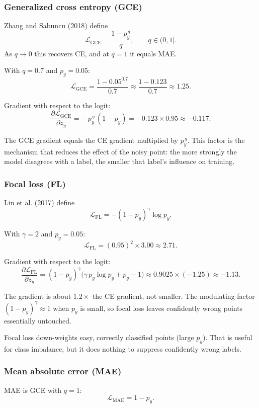 \documentclass[11pt]{article}
\begin{document}
\subsubsection*{Generalized cross entropy (GCE)}

Zhang and Sabuncu (2018) define
\[
\mathcal{L}_{\mathrm{GCE}} = \frac{1 - p_y^{\,q}}{q}, \qquad q \in (0, 1].
\]
As $q \to 0$ this recovers CE, and at $q = 1$ it equals MAE.

With $q = 0.7$ and $p_y = 0.05$:
\[
\mathcal{L}_{\mathrm{GCE}} = \frac{1 - 0.05^{0.7}}{0.7} \approx \frac{1 - 0.123}{0.7} \approx 1.25.
\]

Gradient with respect to the logit:
\[
\frac{\partial \mathcal{L}_{\mathrm{GCE}}}{\partial z_y} = -\,p_y^{\,q}\,(1 - p_y) = -0.123 \times 0.95 \approx -0.117.
\]

The GCE gradient equals the CE gradient multiplied by $p_y^{\,q}$. This factor is the mechanism that reduces the effect of the noisy point: the more strongly the model disagrees with a label, the smaller that label's influence on training.

\subsubsection*{Focal loss (FL)}

Lin et al. (2017) define
\[
\mathcal{L}_{\mathrm{FL}} = -(1 - p_y)^{\gamma} \log p_y.
\]

With $\gamma = 2$ and $p_y = 0.05$:
\[
\mathcal{L}_{\mathrm{FL}} = (0.95)^2 \times 3.00 \approx 2.71.
\]

Gradient with respect to the logit:
\[
\frac{\partial \mathcal{L}_{\mathrm{FL}}}{\partial z_y} = (1 - p_y)^{\gamma}\bigl(\gamma\, p_y \log p_y + p_y - 1\bigr) \approx 0.9025 \times (-1.25) \approx -1.13.
\]

The gradient is about $1.2\times$ the CE gradient, not smaller. The modulating factor $(1 - p_y)^{\gamma} \approx 1$ when $p_y$ is small, so focal loss leaves confidently wrong points essentially untouched.

Focal loss down-weights easy, correctly classified points (large $p_y$). That is useful for class imbalance, but it does nothing to suppress confidently wrong labels.

\subsubsection*{Mean absolute error (MAE)}

MAE is GCE with $q = 1$:
\[
\mathcal{L}_{\mathrm{MAE}} = 1 - p_y.
\]
\end{document}
